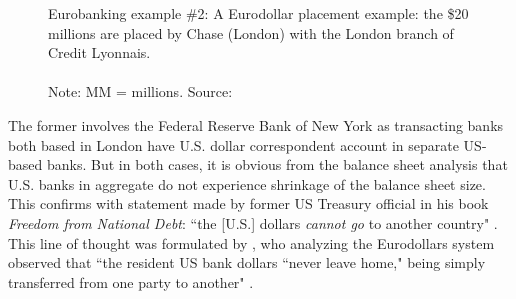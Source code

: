 \begin{figure}[!ht]
  \caption[Eurobanking example \#2]%
  {Eurobanking example \#2: A Eurodollar placement example: the \$20 millions are placed by Chase (London) with the London branch of Credit Lyonnais. \\ \\Note: MM = millions. Source: \citep[p.~216]{stigum2007}}
\label{fig:eurodollar2}
\end{figure}

The former involves the Federal Reserve Bank of New York as transacting banks both based in London have U.S. dollar correspondent account in separate US-based banks.
But in both cases, it is obvious from the balance sheet analysis that U.S. banks in aggregate do not experience shrinkage of the balance sheet size.
This confirms with statement made by former US Treasury official in his book \textit{Freedom from National Debt}: ``the [U.S.] dollars \textit{cannot go} to another country" \citep[emphasis added]{newman2013}. This line of thought was formulated by \citeauthor{earley1981}, who analyzing the Eurodollars system observed that ``the resident US bank dollars ``never leave home," being simply transferred from one party to another" \citep[p.~225]{earley1981}.

